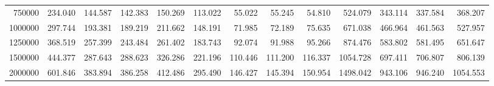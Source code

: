 \begin{tabular}{rrrrrrrrrrrrr}
750000 & 234.040 & 144.587 & 142.383 & 150.269 & 113.022 & 55.022 & 55.245 & 54.810 & 524.079 & 343.114 & 337.584 & 368.207 \\
1000000 & 297.744 & 193.381 & 189.219 & 211.662 & 148.191 & 71.985 & 72.189 & 75.635 & 671.038 & 466.964 & 461.563 & 527.957 \\
1250000 & 368.519 & 257.399 & 243.484 & 261.402 & 183.743 & 92.074 & 91.988 & 95.266 & 874.476 & 583.802 & 581.495 & 651.647 \\
1500000 & 444.377 & 287.643 & 288.623 & 326.286 & 221.196 & 110.446 & 111.200 & 116.337 & 1054.728 & 697.411 & 706.807 & 806.139 \\
2000000 & 601.846 & 383.894 & 386.258 & 412.486 & 295.490 & 146.427 & 145.394 & 150.954 & 1498.042 & 943.106 & 946.240 & 1054.553 \\
\bottomrule
\end{tabular}
